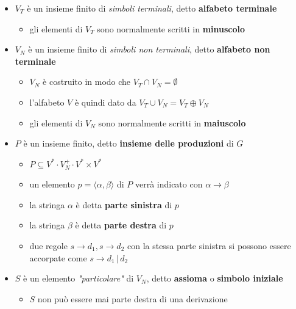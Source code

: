 \documentclass[italian, 10pt]{article}
\begin{document}
\begin{itemize}
  \item \(V_T\) è un insieme finito di \textit{simboli terminali}, detto \textbf{alfabeto terminale}
        \begin{itemize}[label=\(\rightarrow\)]
          \item gli elementi di \(V_T\) sono normalmente scritti in \textbf{minuscolo}
        \end{itemize}
  \item \(V_N\) è un insieme finito di \textit{simboli non terminali}, detto \textbf{alfabeto non terminale}
        \begin{itemize}[label=\(\rightarrow\)]
          \item \(V_N\) è costruito in modo che \(V_T \cap V_N = \emptyset\)
          \item l'alfabeto \(V\) è quindi dato da \(V_T \cup V_N = V_T \oplus V_N\)
          \item gli elementi di \(V_N\) sono normalmente scritti in \textbf{maiuscolo}
        \end{itemize}
  \item \(P\) è un insieme finito, detto \textbf{insieme delle produzioni} di \(G\)
        \begin{itemize}
          \item \(P \subseteq V^\ast \cdot V_N^+ \cdot V^\ast \times V^\ast\)
          \item un elemento \(p = \langle \alpha, \beta \rangle\) di \(P\) verrà indicato con \(\alpha \rightarrow \beta\)
          \item la stringa \(\alpha\) è detta \textbf{parte sinistra} di \(p\)
          \item la stringa \(\beta\) è detta \textbf{parte destra} di \(p\)
          \item due regole \(s \rightarrow d_1, s \rightarrow d_2\) con la stessa parte sinistra si possono essere accorpate come \(s \rightarrow d_1 \, | \, d_2\)
        \end{itemize}
  \item \(S\) è un elemento \textit{"particolare"} di \(V_N\), detto \textbf{assioma} o \textbf{simbolo iniziale}
        \begin{itemize}[label=\(\rightarrow\)]
          \item \(S\) non può essere mai parte destra di una derivazione
        \end{itemize}
\end{itemize}
\end{document}
